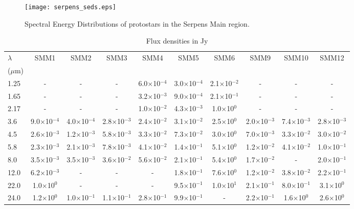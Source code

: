 \documentclass{aa}
\begin{document}
\begin{appendix}
\begin{figure} 
\texttt{[image: serpens\_seds.eps]} 
\caption{Spectral Energy Distributions of protostars in the Serpens Main region.} 
\label{seds} 
\end{figure}

\begin{table*} 
\caption{Flux densities in Jy}      
\centering       %
\label{SED_data}    

\begin{tabular}{l c c c c c c c c c} 
\hline 
$\lambda$ & SMM1  & SMM2  & SMM3 & SMM4 & SMM5  & SMM6 & SMM9 & SMM10 & SMM12 \\ 
($\mu$m) &  &  &  & & & & & & \\ 
\hline 
1.25 &- &- &- & 6.0$\times$10$^{-4}$ & 3.0$\times$10$^{-4}$ & 2.1$\times$10$^{-2}$ &- &- &-\\
1.65 &- &- &- & 3.2$\times$10$^{-3}$ & 9.0$\times$10$^{-4}$ & 2.1$\times$10$^{-1}$ &- &- &-\\
2.17 & -& -& -& 1.0$\times$10$^{-2}$ & 4.3$\times$10$^{-3}$ & 1.0$\times$10$^{0}$ & -&- &-\\
3.6 & 9.0$\times$10$^{-4}$ & 4.0$\times$10$^{-4}$ & 2.8$\times$10$^{-3}$ & 2.4$\times$10$^{-2}$ & 3.1$\times$10$^{-2}$ & 2.5$\times$10$^{0}$ & 2.0$\times$10$^{-3}$ & 7.4$\times$10$^{-3}$ & 2.8$\times$10$^{-3}$\\ 
4.5 & 2.6$\times$10$^{-3}$ & 1.2$\times$10$^{-3}$ & 5.8$\times$10$^{-3}$ & 3.3$\times$10$^{-2}$ & 7.3$\times$10$^{-2}$ & 3.0$\times$10$^{0}$ & 7.0$\times$10$^{-3}$ & 3.3$\times$10$^{-2}$ & 3.0$\times$10$^{-2}$\\ 
5.8 & 2.3$\times$10$^{-3}$ & 2.1$\times$10$^{-3}$ & 7.8$\times$10$^{-3}$ & 4.1$\times$10$^{-2}$ & 1.4$\times$10$^{-1}$ & 5.1$\times$10$^{0}$ & 1.2$\times$10$^{-2}$ & 4.1$\times$10$^{-2}$ & 1.0$\times$10$^{-1}$\\
8.0 & 3.5$\times$10$^{-3}$ & 3.5$\times$10$^{-3}$ & 3.6$\times$10$^{-2}$ & 5.6$\times$10$^{-2}$ & 2.1$\times$10$^{-1}$ & 5.4$\times$10$^{0}$ & 1.7$\times$10$^{-2}$ & - & 2.0$\times$10$^{-1}$\\ 
12.0 & 6.2$\times$10$^{-3}$ & - & - &- & 1.8$\times$10$^{-1}$ & 7.6$\times$10$^{0}$ & 1.2$\times$10$^{-2}$ & 3.8$\times$10$^{-2}$ & 2.2$\times$10$^{-1}$\\ 
22.0 & 1.0$\times$10$^{0}$ & - & - & -& 9.5$\times$10$^{-1}$ & 1.0$\times$10$^{1}$ & 2.1$\times$10$^{-1}$ & 8.0$\times$10$^{-1}$ & 3.1$\times$10$^{0}$\\ 
24.0 & 1.2$\times$10$^{0}$ & 1.0$\times$10$^{-1}$ & 1.1$\times$10$^{-1}$ & 2.8$\times$10$^{-1}$ & 9.9$\times$10$^{-1}$ &- & 2.2$\times$10$^{-1}$ & 1.6$\times$10$^{0}$ & 2.6$\times$10$^{0}$\\

\end{tabular}
\end{table*}
\end{appendix}
\end{document}
